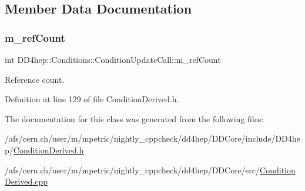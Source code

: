 \subsection{Member Data Documentation}
\hypertarget{class_d_d4hep_1_1_conditions_1_1_condition_update_call_a7456626d494306f498809d5d57150b28}{}\label{class_d_d4hep_1_1_conditions_1_1_condition_update_call_a7456626d494306f498809d5d57150b28} 
\subsubsection{\texorpdfstring{m\+\_\+ref\+Count}{m\_refCount}}
{\footnotesize\ttfamily int D\+D4hep\+::\+Conditions\+::\+Condition\+Update\+Call\+::m\+\_\+ref\+Count\hspace{0.3cm}{\ttfamily [protected]}}



Reference count. 



Definition at line 129 of file Condition\+Derived.\+h.



The documentation for this class was generated from the following files\+:\begin{DoxyCompactItemize}
\item 
/afs/cern.\+ch/user/m/mpetric/nightly\+\_\+cppcheck/dd4hep/\+D\+D\+Core/include/\+D\+D4hep/\hyperlink{_condition_derived_8h}{Condition\+Derived.\+h}\item 
/afs/cern.\+ch/user/m/mpetric/nightly\+\_\+cppcheck/dd4hep/\+D\+D\+Core/src/\hyperlink{_condition_derived_8cpp}{Condition\+Derived.\+cpp}\end{DoxyCompactItemize}
